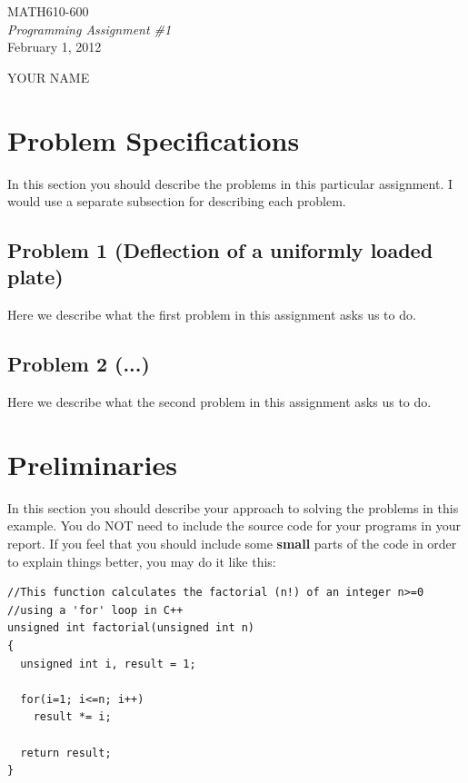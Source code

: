 \documentclass[11pt]{article}
\begin{document}
	
	\ifpdf
	\else
	\fi

\begin{titlepage}

\vspace*{55mm}
\begin{center}
{\huge MATH610-600}\\[1cm]
{\em \huge Programming Assignment \#1}\\[70mm]
{\large February 1, 2012} \\[15mm]
\end{center}

\begin{flushright}
{\LARGE YOUR NAME}
\end{flushright}

\vfill

\end{titlepage}

\newpage
\section{Problem Specifications}
In this section you should describe the problems in this particular assignment.
I would use a separate subsection for describing each problem.
\subsection{Problem 1 (Deflection of a uniformly loaded plate)}
Here we describe what the first problem in this assignment asks us to do.
\subsection{Problem 2 (...)}
Here we describe what the second problem in this assignment asks us to do.

\section{Preliminaries}
In this section you should describe your approach to solving the problems
in this example. You do NOT need to include the source code for your 
programs in your report. If you feel that you should include some \textbf{small}
parts of the code in order to explain things better, you may do it like
this:
\begin{verbatim}
//This function calculates the factorial (n!) of an integer n>=0
//using a 'for' loop in C++
unsigned int factorial(unsigned int n)
{
  unsigned int i, result = 1;
  
  for(i=1; i<=n; i++)
    result *= i;

  return result;
}
\end{verbatim}
\end{document}
